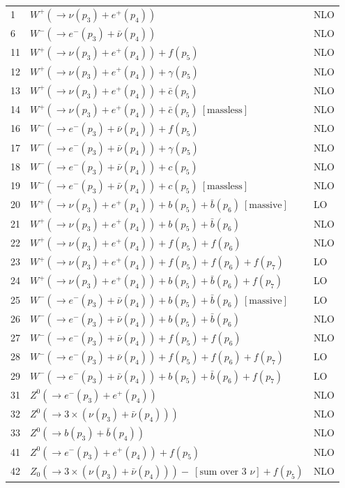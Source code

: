 \documentclass[12pt]{article}
\begin{document}
\begin{itemize}
\begin{table}
\begin{center}
\begin{tabular}{|l|l|l|}
1 & $ W^+(\to \nu(p_3)+e^+(p_4)) $ & NLO \\
6 & $ W^-(\to e^-(p_3)+\bar{\nu}(p_4)) $ & NLO \\
\hline 
11& $ W^+(\to \nu(p_3)+e^+(p_4))+f(p_5) $ & NLO \\
12& $ W^+(\to \nu(p_3)+e^+(p_4))+\gamma(p_5) $ & NLO \\
13& $ W^+(\to \nu(p_3)+e^+(p_4))+\bar{c}(p_5) $ & NLO \\
14& $ W^+(\to \nu(p_3)+e^+(p_4))+\bar{c}(p_5) ~[ \mbox{massless} ] $ & NLO \\
16& $ W^-(\to e^-(p_3)+\bar{\nu}(p_4))+f(p_5) $ & NLO \\
17& $ W^-(\to e^-(p_3)+\bar{\nu}(p_4))+\gamma(p_5) $ & NLO \\
18& $ W^-(\to e^-(p_3)+\bar{\nu}(p_4))+c(p_5) $ & NLO \\
19& $ W^-(\to e^-(p_3)+\bar{\nu}(p_4))+c(p_5) ~[ \mbox{massless} ] $ & NLO \\
\hline 
20& $ W^+(\to \nu(p_3)+e^+(p_4)) +b(p_5)+\bar{b}(p_6) ~[ \mbox{massive} ] $ & LO \\
21& $ W^+(\to \nu(p_3)+e^+(p_4)) +b(p_5)+\bar{b}(p_6) $ & NLO \\
22& $ W^+(\to \nu(p_3)+e^+(p_4)) +f(p_5)+f(p_6) $ & NLO \\
23& $ W^+(\to \nu(p_3)+e^+(p_4)) +f(p_5)+f(p_6)+f(p_7) $ & LO \\
24& $ W^+(\to \nu(p_3)+e^+(p_4)) +b(p_5)+\bar{b}(p_6)+f(p_7) $ & LO \\
25& $ W^-(\to e^-(p_3)+\bar{\nu}(p_4)) +b(p_5)+\bar{b}(p_6) ~[ \mbox{massive} ] $ & LO \\
26& $ W^-(\to e^-(p_3)+\bar{\nu}(p_4)) +b(p_5)+\bar{b}(p_6) $ & NLO \\
27& $ W^-(\to e^-(p_3)+\bar{\nu}(p_4)) +f(p_5)+f(p_6) $ & NLO \\
28& $ W^-(\to e^-(p_3)+\bar{\nu}(p_4)) +f(p_5)+f(p_6)+f(p_7) $ & LO \\
29& $ W^-(\to e^-(p_3)+\bar{\nu}(p_4)) +b(p_5)+\bar{b}(p_6)+f(p_7) $ & LO \\
\hline 
31& $ Z^0(\to e^-(p_3)+e^+(p_4)) $ & NLO \\
32& $ Z^0(\to 3\times(\nu(p_3)+\bar{\nu}(p_4))) $ & NLO \\
33& $ Z^0(\to b(p_3)+\bar{b}(p_4)) $ & NLO \\
\hline 
41& $ Z^0(\to e^-(p_3)+e^+(p_4))+f(p_5) $ & NLO \\
42& $ Z_0(\to 3\times(\nu(p_3)+\bar{\nu}(p_4)))-~[ \mbox{sum over 3 $\nu$} ]+f(p_5) $ & NLO \\

\end{tabular}
\end{center}
\end{table}
\end{itemize}
\end{document}
